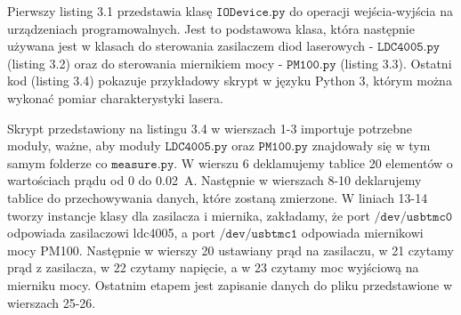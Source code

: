 Pierwszy listing 3.1 przedstawia klasę $\mathtt{IODevice.py}$ do operacji  wejścia-wyjścia na urządzeniach programowalnych.
Jest to podstawowa klasa, która następnie używana jest w klasach do sterowania zasilaczem
diod laserowych - $\mathtt{LDC4005.py}$ (listing 3.2) oraz do sterowania miernikiem mocy - $\mathtt{PM100.py}$ (listing 3.3).
Ostatni kod (listing 3.4) pokazuje przykładowy skrypt w języku Python 3, którym można wykonać pomiar charakterystyki lasera.
\newpage



Skrypt przedstawiony na listingu 3.4 w wierszach 1-3 importuje potrzebne moduły, ważne, aby moduły $\mathtt{LDC4005.py}$ oraz $\mathtt{PM100.py}$
znajdowały się w tym samym folderze co $\mathtt{measure.py}$.
W wierszu 6 deklamujemy tablice 20 elementów o wartościach prądu od 0 do 0.02 \,A. Następnie w wierszach 8-10 deklarujemy tablice do przechowywania danych, które zostaną zmierzone. W liniach 13-14 tworzy instancje klasy dla zasilacza i miernika, zakładamy, że port $\mathtt{/dev/usbtmc0}$ odpowiada zasilaczowi ldc4005, a port $\mathtt{/dev/usbtmc1}$ odpowiada miernikowi mocy PM100.
Następnie w wierszy 20 ustawiany prąd na zasilaczu, w 21 czytamy prąd z zasilacza, w 22 czytamy napięcie, a w 23 czytamy moc wyjściową na mierniku mocy.
Ostatnim etapem jest zapisanie danych do pliku  przedstawione w wierszach 25-26.

